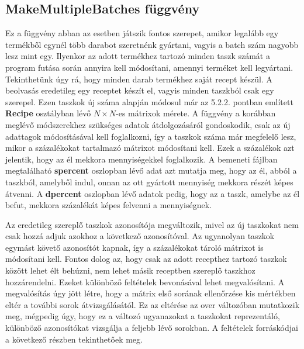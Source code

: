 \subsection{MakeMultipleBatches függvény}
Ez a függvény abban az esetben játszik fontos szerepet, amikor legalább egy termékből egynél több darabot szeretnénk gyártani, vagyis a batch szám nagyobb lesz mint egy. Ilyenkor az adott termékhez tartozó minden taszk számát a program futása során annyira kell módosítani, amennyi terméket kell legyártani. Tekinthetünk úgy rá, hogy minden darab termékhez saját recept készül. A beolvasás eredetileg egy receptet készít el, vagyis minden taszkból csak egy szerepel. Ezen taszkok új száma alapján módosul már az 5.2.2. pontban említett \textbf{Recipe} osztályban lévő $N\times N$-es mátrixok mérete. A függvény a korábban meglévő módszerekhez szükséges adatok átdolgozásáról gondoskodik, csak az új adattagok módosításával kell foglalkozni, így a taszkok száma már megfelelő lesz, mikor a százalékokat tartalmazó mátrixot módosítani kell. Ezek a százalékok azt jelentik, hogy az él mekkora mennyiségekkel foglalkozik. A bemeneti fájlban megtalálható \textbf{s\textunderscore percent} oszlopban lévő adat azt mutatja meg, hogy az él, abból a taszkból, amelyből indul, onnan az ott gyártott mennyiség mekkora részét képes átvenni. A \textbf{d\textunderscore percent} oszlopban lévő adatok pedig, hogy az a taszk, amelybe az él befut, mekkora százalékát képes felvenni a mennyiségnek. 

Az eredetileg szereplő taszkok azonosítója megváltozik, mivel az új taszkokat nem csak hozzá adjuk azokhoz a következő azonosítóval. Az ugyanolyan taszkok egymást követő azonosítót kapnak, így a százalékokat tároló mátrixot is módosítani kell. Fontos dolog az, hogy csak az adott recepthez tartozó taszkok között lehet élt behúzni, nem lehet másik receptben szereplő taszkhoz hozzárendelni. Ezeket különböző feltételek bevonásával lehet megvalósítani. A megvalósítás úgy jött létre, hogy a mátrix  első sorának ellenőrzése kis mértékben eltér a további sorok átvizsgálásától. Ez az eltérése az over változóban mutatkozik meg, mégpedig úgy, hogy ez a változó ugyanazokat a taszkokat reprezentáló, különböző azonosítókat vizsgálja a feljebb lévő sorokban. A feltételek forráskódjai a következő részben tekinthetőek meg.

